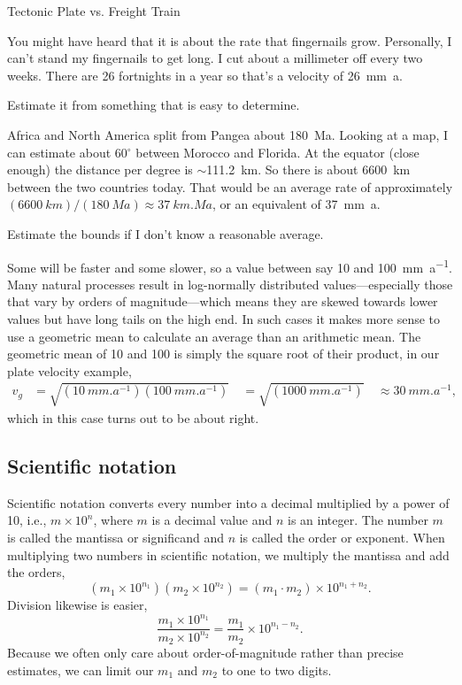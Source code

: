 \begin{activity}{Tectonic Plate vs. Freight Train}
\begin{description}
    You might have heard that it is about the rate that fingernails grow.  Personally, I can't stand my fingernails to get long.  I cut about a millimeter off every two weeks.  There are 26 fortnights in a year so that's a velocity of \SI{26}{mm.a}.

    \item [Case 2:] Estimate it from something that is easy to determine.

    Africa and North America split from Pangea about 180~Ma.  Looking at a map, I can estimate about 60$^\circ$ between Morocco and Florida.  At the equator (close enough) the distance per degree is $\sim$\SI{111.2}{km}.  So there is about 6600~km between the two countries today.  That would be an average rate of approximately $(\SI{6600}{km})/(\SI{180}{Ma}) \approx \SI{37}{km.Ma}$, or an equivalent of \SI{37}{mm.a}.

    \item [Case 3:] Estimate the bounds if I don't know a reasonable average.

    Some will be faster and some slower, so a value between say 10 and 100~\si{mm.a^{-1}}. Many natural processes result in log-normally distributed values---especially those that vary by orders of magnitude---which means they are skewed towards lower values but have long tails on the high end.  In such cases it makes more sense to use a geometric mean to calculate an average than an arithmetic mean.  The geometric mean of 10 and 100 is simply the square root of their product, in our plate velocity example,
    \begin{align*}
        v_g &= \sqrt{(\SI{10}{mm.a^{-1}})(\SI{100}{mm.a^{-1}})} \
        &= \sqrt{(\SI{1000}{mm.a^{-1}})} \
        &\approx \SI{30}{mm.a^{-1}} ,
    \end{align*}
    which in this case turns out to be about right.
\end{description}

\subsection{Scientific notation}
Scientific notation converts every number into a decimal multiplied by a power of 10, i.e., $m \times 10^{n}$, where $m$ is a decimal value and $n$ is an integer.  The number $m$ is called the mantissa or significand and $n$ is called the order or exponent.  When multiplying two numbers in scientific notation, we multiply the mantissa and add the orders,
\[
    (m_1 \times 10^{n_1}) (m_2 \times 10^{n_2}) = 
    (m_1 \cdot m_2) \times 10^{n_1 + n_2}\! .
\]
Division likewise is easier,
\[
    \frac{m_1 \times 10^{n_1}} {m_2 \times 10^{n_2}} = 
    \frac{m_1}{m_2} \times 10^{n_1 - n_2}\! .
\]
Because we often only care about order-of-magnitude rather than precise estimates, we can limit our $m_1$ and $m_2$ to one to two digits.


\end{activity}
